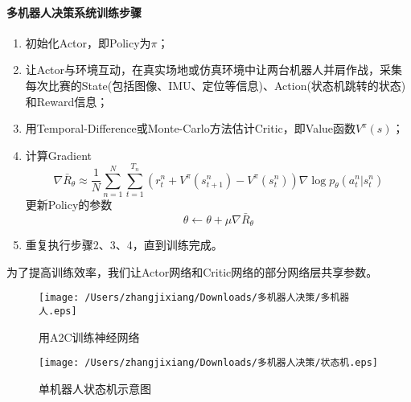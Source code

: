 \documentclass[12pt]{ctexart}
\begin{document}
\paragraph{多机器人决策系统训练步骤}
\begin{enumerate}
	\item 初始化Actor，即Policy为$\pi$；
	\item 让Actor与环境互动，在真实场地或仿真环境中让两台机器人并肩作战，采集每次比赛的State(包括图像、IMU、定位等信息)、Action(状态机跳转的状态)和Reward信息；
	\item 用Temporal-Difference或Monte-Carlo方法估计Critic，即Value函数$V^{\pi}(s)$；
	\item 计算Gradient
	\begin{equation}\label{key}
	\nabla\bar{R}_{\theta} \approx \frac{1}{N}\sum\limits_{n = 1}^N {\sum\limits_{t = 1}^{{T_n}} {(r_{t}^{n}+V^{\pi}(s_{t+1}^{n})-V^{\pi}(s_{t}^{n}))\nabla } } \log {p_\theta }(a_t^n|s_t^n)
	\end{equation}
	更新Policy的参数
	\begin{equation}\label{key}
	\theta  \leftarrow \theta  + \mu \nabla {\bar R_\theta }
	\end{equation}
	\item 重复执行步骤2、3、4，直到训练完成。
\end{enumerate}
为了提高训练效率，我们让Actor网络和Critic网络的部分网络层共享参数。

\begin{figure}[tbph!]
	\centering
	\texttt{[image: /Users/zhangjixiang/Downloads/多机器人决策/多机器人.eps]}
	\caption{用A2C训练神经网络}
	\label{fig:a2c}
\end{figure}


\begin{figure}[tbph!]
	\centering
	\texttt{[image: /Users/zhangjixiang/Downloads/多机器人决策/状态机.eps]}
	\caption{单机器人状态机示意图}
	\label{fig:fsm}
\end{figure}
\end{document}
